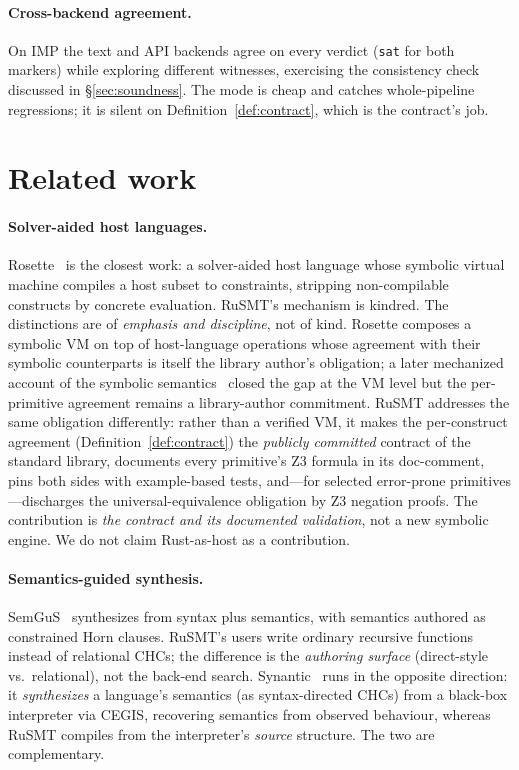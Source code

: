 \documentclass[11pt,a4paper]{article}
\theoremstyle{definition}
\theoremstyle{remark}
\newcommand{\rusmt}{RuSMT}
\newcommand{\imp}{IMP}
\newcommand{\code}[1]{\texttt{#1}}
\begin{document}
\paragraph{Cross-backend agreement.}
On \imp{} the text and API backends agree on every verdict (\code{sat} for both
markers) while exploring different witnesses, exercising the consistency check
discussed in \S\ref{sec:soundness}. The mode is cheap and catches whole-pipeline
regressions; it is silent on Definition~\ref{def:contract}, which is the
contract's job.

\section{Related work}
\label{sec:related}

\paragraph{Solver-aided host languages.}
Rosette~\cite{torlak2013rosette,torlak2014rosette} is the closest work: a
solver-aided host language whose symbolic virtual machine compiles a host subset
to constraints, stripping non-compilable constructs by concrete evaluation.
\rusmt{}'s mechanism is kindred. The distinctions are of \emph{emphasis and
discipline}, not of kind. Rosette composes a symbolic VM on top of host-language
operations whose agreement with their symbolic counterparts is itself the
library author's obligation; a later mechanized account of the symbolic
semantics~\cite{porncharoenwase2022leanette} closed the gap at the VM level but
the per-primitive agreement remains a library-author commitment.
\rusmt{} addresses the same obligation differently: rather than a verified VM,
it makes the per-construct agreement (Definition~\ref{def:contract}) the
\emph{publicly committed} contract of the standard library, documents every
primitive's Z3 formula in its doc-comment, pins both sides with example-based
tests, and---for selected error-prone primitives---discharges the
universal-equivalence obligation by Z3 negation proofs. The contribution is
\emph{the contract and its documented validation}, not a new symbolic engine.
We do not claim Rust-as-host as a contribution.

\paragraph{Semantics-guided synthesis.}
SemGuS~\cite{kim2021semgus} synthesizes from syntax plus semantics, with
semantics authored as constrained Horn clauses. \rusmt{}'s users write ordinary
recursive functions instead of relational CHCs; the difference is the
\emph{authoring surface} (direct-style vs.\ relational), not the back-end search.
Synantic~\cite{liu2024synantic} runs in the opposite direction: it
\emph{synthesizes} a language's semantics (as syntax-directed CHCs) from a
black-box interpreter via CEGIS, recovering semantics from observed behaviour,
whereas \rusmt{} compiles from the interpreter's \emph{source} structure. The
two are complementary.
\end{document}

